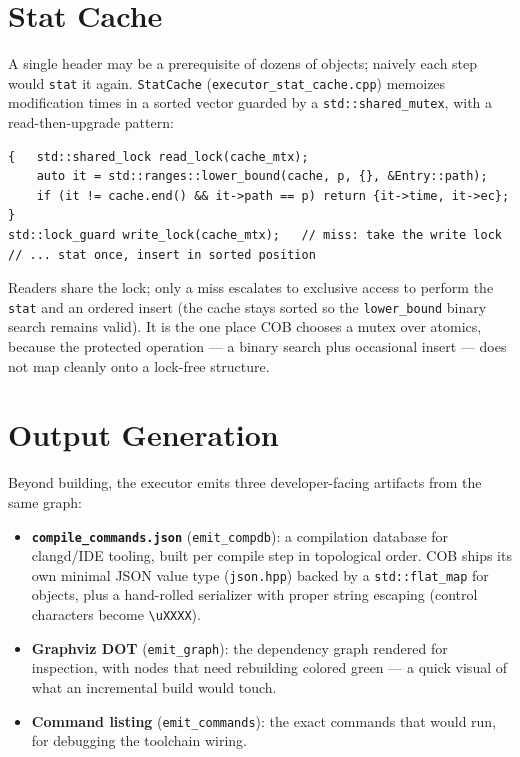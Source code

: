 \documentclass[11pt]{article}
\begin{document}
\section{Stat Cache}\label{sec:statcache}

A single header may be a prerequisite of dozens of objects; naively each step
would \lstinline|stat| it again. \lstinline|StatCache|
(\texttt{executor\_stat\_cache.cpp}) memoizes modification times in a sorted
vector guarded by a \lstinline|std::shared_mutex|, with a read-then-upgrade
pattern:

\begin{lstlisting}
{   std::shared_lock read_lock(cache_mtx);
    auto it = std::ranges::lower_bound(cache, p, {}, &Entry::path);
    if (it != cache.end() && it->path == p) return {it->time, it->ec};
}
std::lock_guard write_lock(cache_mtx);   // miss: take the write lock
// ... stat once, insert in sorted position
\end{lstlisting}

Readers share the lock; only a miss escalates to exclusive access to perform the
\lstinline|stat| and an ordered insert (the cache stays sorted so the
\lstinline|lower_bound| binary search remains valid). It is the one place COB
chooses a mutex over atomics, because the protected operation --- a binary
search plus occasional insert --- does not map cleanly onto a lock-free
structure.

\section{Output Generation}

Beyond building, the executor emits three developer-facing artifacts from the
same graph:

\begin{itemize}
  \item \textbf{\texttt{compile\_commands.json}} (\lstinline|emit_compdb|): a
  compilation database for clangd/IDE tooling, built per compile step in
  topological order. COB ships its own minimal JSON value type
  (\texttt{json.hpp}) backed by a \lstinline|std::flat_map| for objects, plus a
  hand-rolled serializer with proper string escaping (control characters become
  \lstinline|\uXXXX|).
  \item \textbf{Graphviz DOT} (\lstinline|emit_graph|): the dependency graph
  rendered for inspection, with nodes that need rebuilding colored green ---
  a quick visual of what an incremental build would touch.
  \item \textbf{Command listing} (\lstinline|emit_commands|): the exact commands
  that would run, for debugging the toolchain wiring.
\end{itemize}
\end{document}
